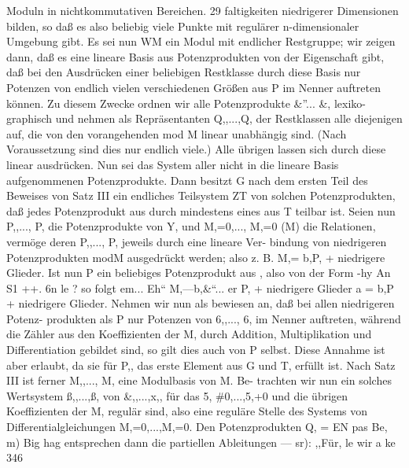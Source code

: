 \documentclass[11pt,a4paper]{article}
\theoremstyle{plain}
\theoremstyle{definition}
\begin{document}
Moduln in nichtkommutativen Bereichen. 
29 
faltigkeiten niedrigerer Dimensionen bilden, so daß es also beliebig viele 
Punkte mit regulärer n-dimensionaler Umgebung gibt. 
Es sei nun WM ein Modul mit endlicher Restgruppe; wir zeigen dann, 
daß es eine lineare Basis aus Potenzprodukten von der Eigenschaft gibt, 
daß bei den Ausdrücken einer beliebigen Restklasse durch diese Basis 
nur Potenzen von endlich vielen verschiedenen Größen aus P im Nenner 
auftreten können. 
Zu diesem Zwecke ordnen wir alle Potenzprodukte \&''... \&, lexiko- 
graphisch und nehmen als Repräsentanten Q,,...,Q, der Restklassen alle 
diejenigen auf, die von den vorangehenden mod M linear unabhängig sind. 
(Nach Voraussetzung sind dies nur endlich viele.) 
Alle übrigen lassen sich 
durch diese linear ausdrücken. 
Nun sei  das System aller nicht in die lineare Basis aufgenommenen 
Potenzprodukte. 
Dann besitzt G nach dem ersten Teil des Beweises von 
Satz III ein endliches Teilsystem ZT von solchen Potenzprodukten, 
daß 
jedes Potenzprodukt aus  durch mindestens eines aus T teilbar ist. Seien 
nun P,,..., P, die Potenzprodukte von Y, und M,=0,..., M,=0 (M) 
die Relationen, vermöge deren P,,..., P, jeweils durch eine lineare Ver- 
bindung von 
niedrigeren Potenzprodukten modM ausgedrückt werden; 
also z. B. 
M,= b,P, + niedrigere Glieder. 
Ist nun P ein beliebiges Potenzprodukt 
aus , also von 
der Form 
-hy 
\guillemotleft{}An 
S1 
++. 6n le ? 
so folgt 
em... Eh`` M,---b,\&``... er P, + niedrigere Glieder 
a 
= b,P + niedrigere Glieder. 
Nehmen wir nun als bewiesen an, daß bei allen niedrigeren Potenz- 
produkten als P nur Potenzen von 6,,..., 6, im Nenner auftreten, während 
die Zähler aus den Koeffizienten 
der M, durch Addition, Multiplikation 
und Differentiation gebildet sind, so gilt dies auch von P selbst. 
Diese 
Annahme ist aber erlaubt, da sie für P,, das erste Element aus G und T, 
erfüllt ist. 
Nach Satz III ist ferner M,,..., M, eine Modulbasis von M. Be- 
trachten wir nun ein solches Wertsystem ß,,...,ß, von \&,,...,x,, für 
das 5, \#0,...,5,+0 
und die übrigen Koeffizienten 
der M, regulär 
sind, 
also 
eine reguläre Stelle des Systems von 
Differentialgleichungen 
M,=0,...,M,=0. 
Den Potenzprodukten Q, = EN 
pas Be, 
m) 
Big 
hag 
entsprechen dann die partiellen Ableitungen --- sr): 
,,Für, le 
wir 
a 
ke 
346
\end{document}
